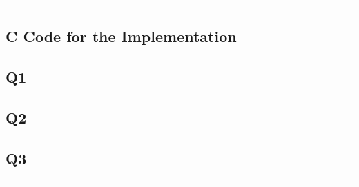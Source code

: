 \documentclass[a4paper,11pt]{article}%
\begin{document}
\vfill
\hrule
\vspace{0.5cm}

\pagebreak
\begin{appendices}
	\section{C Code for the Implementation}
	\subsection{Q1}
	
	\pagebreak
	\subsection{Q2}
	
	\pagebreak
	\subsection{Q3}
	
	\pagebreak

\end{appendices}


\vspace{1cm}
\hrule
\vspace{0.5cm}


\end{document}
